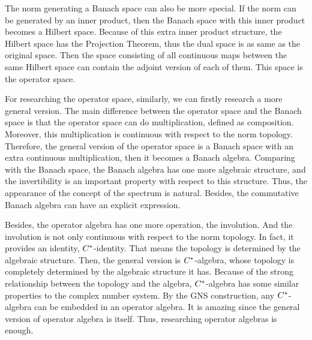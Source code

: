 The norm generating a Banach space can also be more special. If the norm can be generated by an inner product, then the Banach space with this inner product becomes a Hilbert space. Because of this extra inner product structure, the Hilbert space has the Projection Theorem, thus the dual space is as same as the original space. Then the space consisting of all continuous maps between the same Hilbert space can contain the adjoint version of each of them. This space is the operator space.

For researching the operator space, similarly, we can firstly research a more general version. The main difference between the operator space and the Banach space is that the operator space can do multiplication, defined as composition. Moreover, this multiplication is continuous with respect to the norm topology. Therefore, the general version of the operator space is a Banach space with an extra continuous multiplication, then it becomes a Banach algebra. Comparing with the Banach space, the Banach algebra has one more algebraic structure, and the invertibility is an important property with respect to this structure. Thus, the appearance of the concept of the spectrum is natural. Besides, the commutative Banach algebra can have an explicit expression.

Besides, the operator algebra has one more operation, the involution. And the involution is not only continuous with respect to the norm topology. In fact, it provides an identity, $C^{*}$-identity. That means the topology is determined by the algebraic structure. Then, the general version is $C^{*}$-algebra, whose topology is completely determined by the algebraic structure it has. Because of the strong relationship between the topology and the algebra, $C^{*}$-algebra has some similar properties to the complex number system. By the GNS construction, any $C^{*}$-algebra can be embedded in an operator algebra. It is amazing since the general version of operator algebra is itself. Thus, researching operator algebras is enough.

